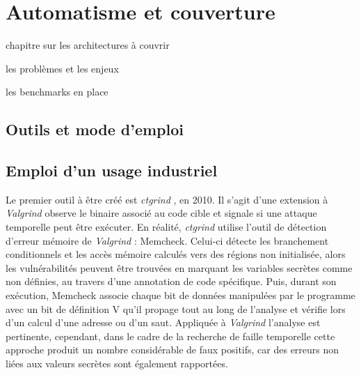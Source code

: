 \chapter{Automatisme et couverture}
\label{chap:automateVerifAutomatisme}

chapitre sur les architectures à couvrir 

les problèmes et les enjeux

les benchmarks en place


\section{Outils et mode d'emploi}


\section{Emploi d'un usage industriel}

Le premier outil à être créé est \textit{ctgrind} \cite{ctgrind}, en 2010. Il s'agit d'une extension à \textit{Valgrind} observe le binaire associé au code cible et signale si une attaque temporelle peut être exécuter. En réalité, \textit{ctgrind} utilise l'outil de détection d'erreur mémoire de \textit{Valgrind} : Memcheck. Celui-ci détecte les branchement conditionnels et les accès mémoire calculés vers des régions non initialisée, alors les vulnérabilités peuvent être trouvées en marquant les variables secrètes comme non définies, au travers d'une annotation de code spécifique. Puis, durant son exécution, Memcheck associe chaque bit de données manipulées par le programme avec un bit de définition V qu'il propage tout au long de l'analyse et vérifie lors d'un calcul d'une adresse ou d'un saut. Appliquée à \textit{Valgrind} l'analyse est pertinente, cependant, dans le cadre de la recherche de faille temporelle cette approche produit un nombre considérable de faux positifs, car des erreurs non liées aux valeurs secrètes sont également rapportées.\medbreak



